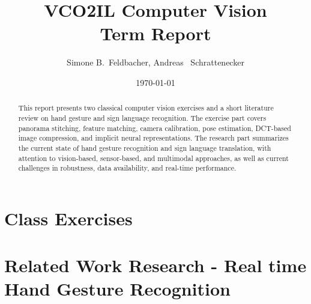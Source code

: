 \documentclass[language=english,titlepage=false,smartquotes=true]{hgbreport}
\begin{document}

\author{Simone B.\ Feldbacher, Andreas \ Schrattenecker}                    %
\title{VCO2IL Computer Vision\\ %
			Term Report}	                 %
\date{\today}

\maketitle

\begin{abstract}\noindent
This report presents two classical computer vision exercises and a short literature review on hand gesture and sign language recognition. The exercise part covers panorama stitching, feature matching, camera calibration, pose estimation, DCT-based image compression, and implicit neural representations. The research part summarizes the current state of hand gesture recognition and sign language translation, with attention to vision-based, sensor-based, and multimodal approaches, as well as current challenges in robustness, data availability, and real-time performance.
\end{abstract}

\tableofcontents

\part{Class Exercises}



\part{Related Work Research - Real time Hand Gesture Recognition}




\appendix                                                   %



\MakeBibliography[nosplit]

\end{document}
